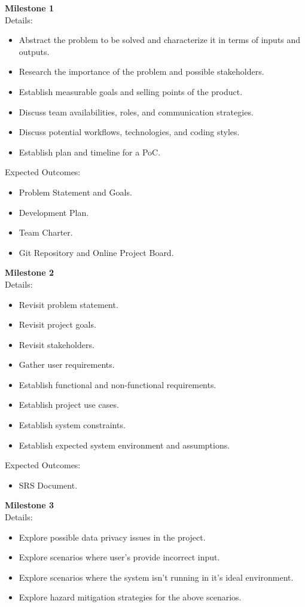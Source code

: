 \documentclass{scrreprt}
\theoremstyle{definition}
\begin{document}
\noindent
\textbf{Milestone 1}\\
Details:
\begin{itemize}
\item Abstract the problem to be solved and characterize it in terms of inputs and outputs.
\item Research the importance of the problem and possible stakeholders.
\item Establish measurable goals and selling points of the product.
\item Discuss team availabilities, roles, and communication strategies.
\item Discuss potential workflows, technologies, and coding styles.
\item Establish plan and timeline for a PoC.
\end{itemize}
Expected Outcomes:
\begin{itemize}
\item Problem Statement and Goals.
\item Development Plan.
\item Team Charter.
\item Git Repository and Online Project Board.
\end{itemize}
\textbf{Milestone 2}\\
Details:
\begin{itemize}
\item Revisit problem statement.
\item Revisit project goals.
\item Revisit stakeholders.
\item Gather user requirements.
\item Establish functional and non-functional requirements.
\item Establish project use cases.
\item Establish system constraints.
\item Establish expected system environment and assumptions.
\end{itemize}
Expected Outcomes:
\begin{itemize}
\item SRS Document.
\end{itemize}
\textbf{Milestone 3}\\
Details:
\begin{itemize}
\item Explore possible data privacy issues in the project.
\item Explore scenarios where user's provide incorrect input.
\item Explore scenarios where the system isn't running in it's ideal environment.
\item Explore hazard mitigation strategies for the above scenarios.
\end{itemize}
\end{document}
